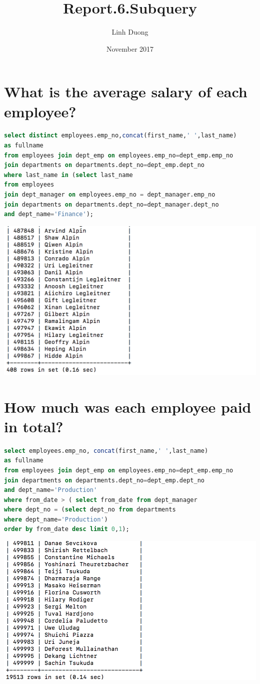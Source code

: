 \documentclass{article}
\title{Report.6.Subquery}
\author{Linh Duong}
\date{November 2017}
\begin{document}
\maketitle

\section{What is the average salary of each employee?}
\begin{lstlisting}[language=sql]
select distinct employees.emp_no,concat(first_name,' ',last_name) 
as fullname
from employees join dept_emp on employees.emp_no=dept_emp.emp_no 
join departments on departments.dept_no=dept_emp.dept_no
where last_name in (select last_name 
from employees 
join dept_manager on employees.emp_no = dept_manager.emp_no
join departments on departments.dept_no=dept_manager.dept_no 
and dept_name='Finance');
\end{lstlisting}
\includegraphics[width=\linewidth]{1.png}

\section{How much was each employee paid in total?}
\begin{lstlisting}[language=sql]
select employees.emp_no, concat(first_name,' ',last_name)
as fullname
from employees join dept_emp on employees.emp_no=dept_emp.emp_no 
join departments on departments.dept_no=dept_emp.dept_no 
and dept_name='Production'
where from_date > ( select from_date from dept_manager 
where dept_no = (select dept_no from departments 
where dept_name='Production') 
order by from_date desc limit 0,1);
\end{lstlisting}
\includegraphics[width=\linewidth]{2.png}
\end{document}
